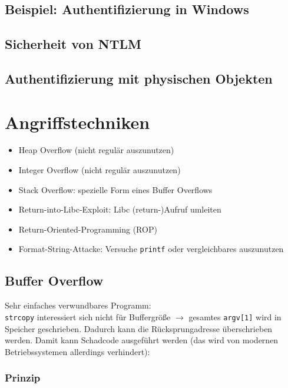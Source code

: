 \subsection{Beispiel: Authentifizierung in Windows}

\subsection{Sicherheit von NTLM}

\subsection{Authentifizierung mit physischen Objekten}

\section{Angriffstechniken}
\begin{itemize}
\item Heap Overflow (nicht regulär auszunutzen)
\item Integer Overflow (nicht regulär auszunutzen)
\item Stack Overflow: spezielle Form eines Buffer Overflows
\item Return-into-Libc-Exploit: Libc (return-)Aufruf umleiten
\item Return-Oriented-Programming (ROP)
\item Format-String-Attacke: Versuche \lstinline`printf` oder vergleichbares auszunutzen
\end{itemize}

\subsection{Buffer Overflow}
Sehr einfaches verwundbares Programm:\\
\lstinline`strcopy` interessiert sich nicht für Buffergröße $\to$ gesamtes \lstinline`argv[1]` wird in Speicher geschrieben. Dadurch kann die Rücksprungadresse überschrieben werden. Damit kann Schadcode ausgeführt werden (das wird von modernen Betriebssystemen allerdings verhindert):

\subsubsection{Prinzip}

